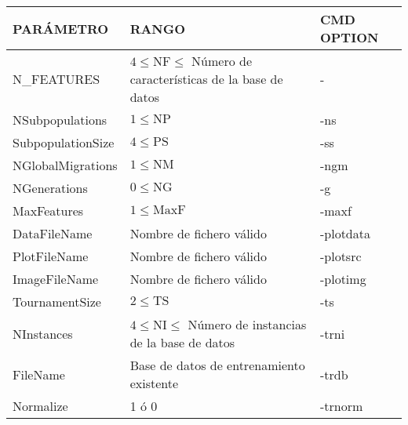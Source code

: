 \begin{table}[htbp]
    \centering
    \footnotesize
    \setlength{\tabcolsep}{3pt}
    \begin{tabular}{|p{3cm}|p{6cm}|p{2.2cm}|}
        \hline
        \textbf{PARÁMETRO}  & \textbf{RANGO}                                                          & \textbf{CMD OPTION} \\ \hline
        N\_FEATURES         & $4 \leq \mathrm{NF} \leq$ Número de características de la base de datos & -                   \\ \hline
        NSubpopulations     & $1 \leq \mathrm{NP}$                                                    & -ns                 \\ \hline
        SubpopulationSize   & $4 \leq \mathrm{PS}$                                                    & -ss                 \\ \hline
        NGlobalMigrations   & $1 \leq \mathrm{NM}$                                                    & -ngm                \\ \hline
        NGenerations        & $0 \leq \mathrm{NG}$                                                    & -g                  \\ \hline
        MaxFeatures         & $1 \leq \mathrm{MaxF}$                                                  & -maxf               \\ \hline
        DataFileName        & Nombre de fichero válido                                                & -plotdata           \\ \hline
        PlotFileName        & Nombre de fichero válido                                                & -plotsrc            \\ \hline
        ImageFileName       & Nombre de fichero válido                                                & -plotimg            \\ \hline
        TournamentSize      & $2 \leq \mathrm{TS}$                                                    & -ts                 \\ \hline
        NInstances          & $4 \leq \mathrm{NI} \leq$ Número de instancias de la base de datos      & -trni               \\ \hline
        FileName            & Base de datos de entrenamiento existente                                & -trdb               \\ \hline
        Normalize           & 1 ó 0                                                                   & -trnorm             \\ \hline

\end{tabular}
\end{table}
